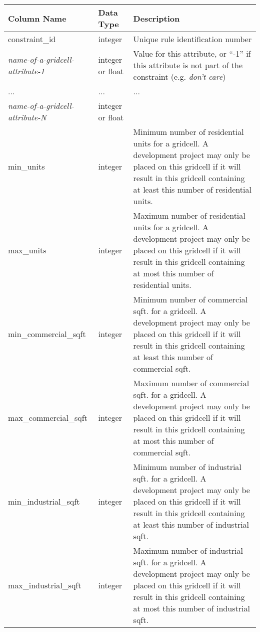 \begin{tabular}{llp{3.5in}}

\textbf{Column Name} & \textbf{Data Type} & \textbf{Description} \\

\hline constraint_id & integer & Unique rule identification number  \\

\hline \emph{name-of-a-gridcell-attribute-1} & integer or float &  Value for this
attribute, or ``-1'' if this attribute is not part of the constraint (e.g.
\emph{don't care}) \\\hline
... & ... & ... \\\hline
\emph{name-of-a-gridcell-attribute-N} & integer or float & \\
\hline min_units & integer & Minimum number of residential units for a gridcell.
A development project may only be placed on this gridcell if it will result in
this gridcell containing at least this number of residential units. \\

\hline max_units & integer & Maximum number of residential units for a gridcell.
A development project may only be placed on this gridcell if it will result in
this gridcell containing at most this number of residential units. \\

\hline min_commercial_sqft & integer & Minimum number of commercial
sqft. for a gridcell.  A development project may only be placed on
this gridcell if it will
result in this gridcell containing at least this number of commercial sqft. \\

\hline max_commercial_sqft & integer & Maximum number of commercial
sqft. for a gridcell. A development project may only be placed on
this gridcell if it will
result in this gridcell containing at most this number of commercial sqft. \\

\hline min_industrial_sqft & integer & Minimum number of industrial
sqft. for a gridcell.  A development project may only be placed on
this gridcell if it will
result in this gridcell containing at least this number of industrial sqft. \\

\hline max_industrial_sqft & integer & Maximum number of industrial
sqft. for a gridcell. A development project may only be placed on
this gridcell if it will
result in this gridcell containing at most this number of industrial sqft. \\

\hline
\end{tabular}

